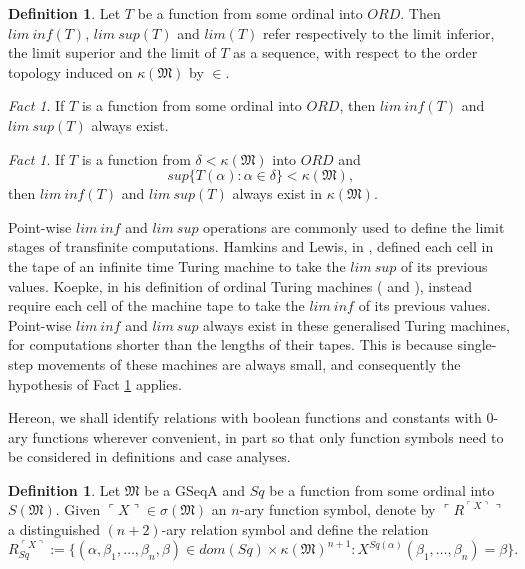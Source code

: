 \documentclass[12pt, twoside]{memoir}
\numberwithin{equation}{section}
\theoremstyle{definition}
\newtheorem{defi}[thm]{Definition}
\theoremstyle{remark}
\newtheorem{fact}[thm]{Fact}
\theoremstyle{definition}
\theoremstyle{definition}
\theoremstyle{definition}
\theoremstyle{remark}
\begin{document}
\begin{defi}
Let $T$ be a function from some ordinal into $ORD$. Then $lim \ inf (T)$, $lim \ sup (T)$ and $lim(T)$ refer respectively to the limit inferior, the limit superior and the limit of $T$ as a sequence, with respect to the order topology induced on $\kappa(\mathfrak{M})$ by $\in$.
\end{defi}

\begin{fact}
If $T$ is a function from some ordinal into $ORD$, then $lim \ inf (T)$ and $lim \ sup (T)$ always exist.
\end{fact}

\begin{fact}\label{fact230}
If $T$ is a function from $\delta < \kappa(\mathfrak{M})$ into $ORD$ and
\begin{equation*}
    sup \{T(\alpha) : \alpha \in \delta\} < \kappa(\mathfrak{M}) \text{,}
\end{equation*}
then $lim \ inf (T)$ and $lim \ sup (T)$ always exist in $\kappa(\mathfrak{M})$.
\end{fact}

Point-wise $lim \ inf$ and $lim \ sup$ operations are commonly used to define the limit stages of transfinite computations. Hamkins and Lewis, in \cite{ittm}, defined each cell in the tape of an infinite time Turing machine to take the $lim \ sup$ of its previous values. Koepke, in his definition of ordinal Turing machines (\cite{koepke1} and \cite{koepke2}), instead require each cell of the machine tape to take the $lim \ inf$ of its previous values. Point-wise $lim \ inf$ and $lim \ sup$ always exist in these generalised Turing machines, for computations shorter than the lengths of their tapes. This is because single-step movements of these machines are always small, and consequently the hypothesis of Fact \ref{fact230} applies.

Hereon, we shall identify relations with boolean functions and constants with $0$-ary functions wherever convenient, in part so that only function symbols need to be considered in definitions and case analyses. 

\begin{defi}
Let $\mathfrak{M}$ be a GSeqA and $Sq$ be a function from some ordinal into $S(\mathfrak{M})$. Given $\ulcorner X \urcorner \in \sigma(\mathfrak{M})$ an $n$-ary function symbol, denote by $\ulcorner R^{\ulcorner X \urcorner} \urcorner$ a distinguished $(n+2)$-ary relation symbol and define the relation 
\begin{equation*}
    R_{Sq}^{\ulcorner X \urcorner} := \{(\alpha, \beta_1, \dots, \beta_n, \beta) \in dom(Sq) \times \kappa(\mathfrak{M})^{n+1} : X^{Sq(\alpha)} (\beta_1, \dots, \beta_n) = \beta\} \text{.}
\end{equation*}
\end{defi}
\end{document}

